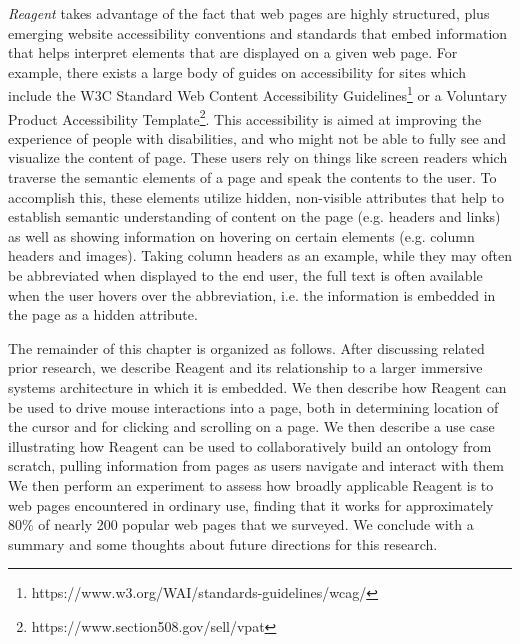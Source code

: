 \textit{Reagent} takes advantage of the fact that web pages are highly
structured, plus emerging website accessibility conventions and
standards that embed information that helps interpret elements that
are displayed on a given web page.  For example, there exists a large
body of guides on accessibility for sites which include the W3C Standard
Web Content Accessibility  
Guidelines\footnote{https://www.w3.org/WAI/standards-guidelines/wcag/} or a
Voluntary Product Accessibility 
Template\footnote{https://www.section508.gov/sell/vpat}. This
accessibility is aimed at improving the experience of people with
disabilities, and who might not be able to fully see and visualize
the content of page. These users rely on things like screen readers
which traverse the semantic elements of a page and speak the
contents to the user. To accomplish this, these elements utilize
hidden, non-visible attributes that help to establish semantic
understanding of content on the page (e.g. headers and links) as well
as showing information on hovering on certain elements (e.g. column
headers and images). Taking column headers as an example, while
they may often be abbreviated when displayed to the end user, the
full text is often available when the user hovers over the
abbreviation, i.e. the information is embedded in the page as a
hidden attribute.

The remainder of this chapter is organized as follows. After
discussing related prior research, we describe Reagent and its
relationship to a larger immersive systems architecture in which it
is embedded. We then describe how Reagent can be used to drive mouse
interactions into a page, both in determining location of the cursor
and for clicking and scrolling on a page. We then describe a use case
illustrating how Reagent can be used to collaboratively build an
ontology from scratch, pulling information from pages as users navigate
and interact with them We then perform an experiment to assess how
broadly applicable Reagent is to web pages encountered in ordinary
use, finding that it works for approximately 80\% of nearly 200 popular
web pages that we surveyed. We conclude with a summary and some
thoughts about future directions for this research.